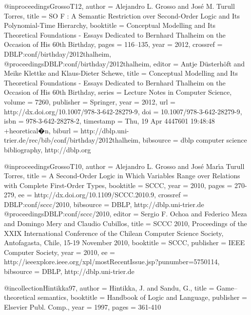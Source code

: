 \documentclass{article}
\begin{document}
@inproceedings{GrossoT12,
  author    = {Alejandro L. Grosso and
               Jos{\'{e}} M. Turull Torres},
  title     = {{SO} {F} : {A} Semantic Restriction over Second-Order Logic and Its
               Polynomial-Time Hierarchy},
  booktitle = {Conceptual Modelling and Its Theoretical Foundations - Essays Dedicated
               to Bernhard Thalheim on the Occasion of His 60th Birthday},
  pages     = {116--135},
  year      = {2012},
  crossref  = {DBLP:conf/birthday/2012thalheim},
}
@proceedings{DBLP:conf/birthday/2012thalheim,
  editor    = {Antje D{\"{u}}sterh{\"{o}}ft and
               Meike Klettke and
               Klaus{-}Dieter Schewe},
  title     = {Conceptual Modelling and Its Theoretical Foundations - Essays Dedicated
               to Bernhard Thalheim on the Occasion of His 60th Birthday},
  series    = {Lecture Notes in Computer Science},
  volume    = {7260},
  publisher = {Springer},
  year      = {2012},
  url       = {http://dx.doi.org/10.1007/978-3-642-28279-9},
  doi       = {10.1007/978-3-642-28279-9},
  isbn      = {978-3-642-28278-2},
  timestamp = {Thu, 19 Apr 4447601 19:48:48 +heoretical�n},
  biburl    = {http://dblp.uni-trier.de/rec/bib/conf/birthday/2012thalheim},
  bibsource = {dblp computer science bibliography, http://dblp.org}
}




@inproceedings{GrossoT10,
  author    = {Alejandro L. Grosso and
               Jos{\'e} Mar{\'{\i}}a {Turull Torres}},
  title     = {A Second-Order Logic in Which Variables Range over Relations
               with Complete First-Order Types},
  booktitle = {SCCC},
  year      = {2010},
  pages     = {270-279},
  ee        = {http://dx.doi.org/10.1109/SCCC.2010.9},
  crossref  = {DBLP:conf/sccc/2010},
  bibsource = {DBLP, http://dblp.uni-trier.de}
}
@proceedings{DBLP:conf/sccc/2010,
  editor    = {Sergio F. Ochoa and
               Federico Meza and
               Domingo Mery and
               Claudio Cubillos},
  title     = {SCCC 2010, Proceedings of the XXIX International Conference
               of the Chilean Computer Science Society, Antofagasta, Chile,
               15-19 November 2010},
  booktitle = {SCCC},
  publisher = {IEEE Computer Society},
  year      = {2010},
  ee        = {http://ieeexplore.ieee.org/xpl/mostRecentIssue.jsp?punumber=5750114},
  bibsource = {DBLP, http://dblp.uni-trier.de}
}

@incollection{Hintikka97,
  author    = {Hintikka, J. and Sandu, G.},
  title     = {Game–theoretical semantics},
  booktitle = {Handbook of Logic and Language},
  publisher = {Elsevier Publ. Comp.},
  year      = {1997},
  pages     = {361-410}
}
\end{document}
